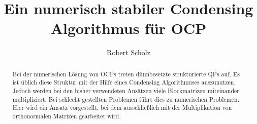 \documentclass{amsart}
\theoremstyle{definition}
\theoremstyle{remark}
\numberwithin{equation}{section}
\begin{document}

\title{Ein numerisch stabiler Condensing Algorithmus für OCP}


\author{Robert	Scholz}
\address{IWR Uni Heidelberg}





\begin{abstract}
Bei der numerischen Lösung von OCPs treten dünnbesetzte strukturierte QPs auf. Es ist üblich diese Struktur mit der Hilfe eines Condensing Algorithmuses auszunutzen. Jedoch werden bei den bisher verwendeten Ansätzen viele Blockmatrizen miteinander multipliziert. Bei schlecht gestellten Problemen führt dies zu numerischen Problemen. Hier wird ein Ansatz vorgestellt, bei dem ausschließlich mit der Multiplikation von orthonormalen Matrizen gearbeitet wird.
\end{abstract}


\maketitle




\end{document}
